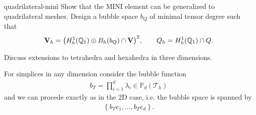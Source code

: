 \begin{Problem}{quadrilateral-mini}
  Show that the MINI element can be generalized to quadrilateral
  meshes. Design a bubble space $b_Q$ of minimal tensor degree such that
  \begin{gather}
    \mathbf V_h = \bigl(H^1_h(\mathbb Q_1) \oplus B_h(b_Q) \cap \mathbf V\bigr)^2,
    \qquad
    Q_h = H^1_h(\mathbb Q_1) \cap Q.
  \end{gather}

  Discuss extensions to tetrahedra and hexahedra in three dimensions.
\begin{solution}
  For simplices in any dimension consider the bubble function
  \begin{align}
    b_T=\prod_{i=1}^d\lambda_i\in \mathbb{P}_d(\mathcal{T}_h)
  \end{align}
  and we can procede exactly as in the 2D case, i.e. the bubble
  space is spanned by
  \begin{align}
   \left\{b_T e_1,\dotsc, b_T e_d\right\}.
  \end{align}


\end{solution}
\end{Problem}
